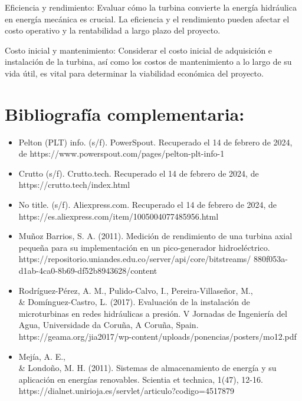 \documentclass[journal]{IEEEtran}
\begin{document}
Eficiencia y rendimiento: Evaluar cómo la turbina convierte la energía hidráulica en energía mecánica es crucial. La eficiencia y el rendimiento pueden afectar el costo operativo y la rentabilidad a largo plazo del proyecto.

Costo inicial y mantenimiento: Considerar el costo inicial de adquisición e instalación de la turbina, así como los costos de mantenimiento a lo largo de su vida útil, es vital para determinar la viabilidad económica del proyecto.

\section{Bibliografía complementaria:}

    \begin{itemize}
        \item Pelton (PLT) info. (s/f). PowerSpout. Recuperado el 14 de febrero de 2024, de https://www.powerspout.com/pages/pelton-plt-info-1
        \item Crutto (s/f). Crutto.tech. Recuperado el 14 de febrero de 2024, de https://crutto.tech/index.html
        \item No title. (s/f). Aliexpress.com. Recuperado el 14 de febrero de 2024, de https://es.aliexpress.com/item/1005004077485956.html
        \item  Muñoz Barrios, S. A. (2011). Medición de rendimiento de una turbina axial pequeña para su implementación en un pico-generador hidroeléctrico. https://repositorio.uniandes.edu.co/server/api/core/bitstreams/ \newline
        880f053a-d1ab-4ca0-8b69-df52b8943628/content
        \item Rodríguez-Pérez, A. M., Pulido-Calvo, I., Pereira-Villaseñor, M., \\\& Domínguez-Castro, L. (2017). Evaluación de la instalación de microturbinas en redes hidráulicas a presión. V Jornadas de Ingeniería del Agua, Universidade da Coruña, A Coruña, Spain.
https://geama.org/jia2017/wp-content/uploads/ponencias/posters/mo12.pdf
         \item Mejía, A. E., \\\& Londoño, M. H. (2011). Sistemas de almacenamiento de energía y su aplicación en energías renovables. Scientia et technica, 1(47), 12-16.
https://dialnet.unirioja.es/servlet/articulo?codigo=4517879

    \end{itemize}
\end{document}
